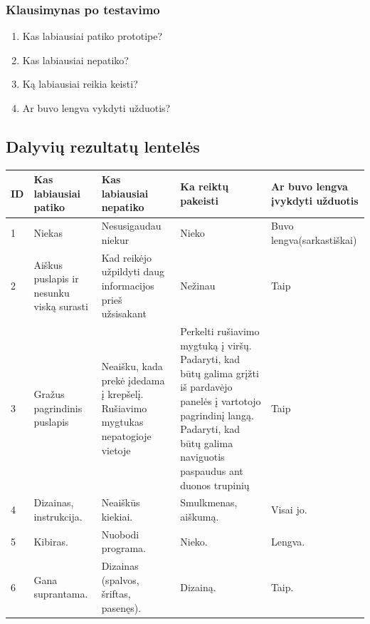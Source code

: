 \documentclass[oneside]{VUMIFPSkursinis}
\begin{document}
	\subsubsection{Klausimynas po testavimo}
	\begin{enumerate}
			\item{Kas labiausiai patiko prototipe?}
			\item{Kas labiausiai nepatiko?}
			\item{Ką labiausiai reikia keisti?}
			\item{Ar buvo lengva vykdyti užduotis?}
	\end{enumerate}
	
	\subsection{Dalyvių rezultatų lentelės}
\begin{center}
    \begin{tabular}{ |p{1cm} | p{3cm} | p{4cm} | p{4cm} | p{3cm} |}
    \hline
	ID&Kas labiausiai patiko&Kas labiausiai nepatiko&Ka reiktų pakeisti&Ar buvo lengva įvykdyti užduotis\\ \hline
	1&Niekas&Nesusigaudau niekur&Nieko&Buvo lengva(sarkastiškai) \\ \hline
	2&Aiškus puslapis ir nesunku viską surasti&Kad reikėjo užpildyti daug informacijos prieš užsisakant&Nežinau&Taip \\ \hline
	3&Gražus pagrindinis puslapis&Neaišku, kada prekė įdedama į krepšelį. Rušiavimo mygtukas nepatogioje vietoje&Perkelti rušiavimo mygtuką į viršų. Padaryti, kad būtų galima grįžti iš pardavėjo panelės į vartotojo pagrindinį langą. Padaryti, kad būtų galima naviguotis paspaudus ant duonos trupinių&Taip \\ \hline
	4&Dizainas, instrukcija.&Neaiškūs kiekiai.&Smulkmenas, aiškumą.&Visai jo. \\ \hline
	5&Kibiras.&Nuobodi programa.&Nieko.&Lengva. \\ \hline
	6&Gana suprantama.&Dizainas (spalvos, šriftas, pasenęs).&Dizainą.&Taip. \\ \hline
   \hline
    \end{tabular}
\end{center}
\end{document}
